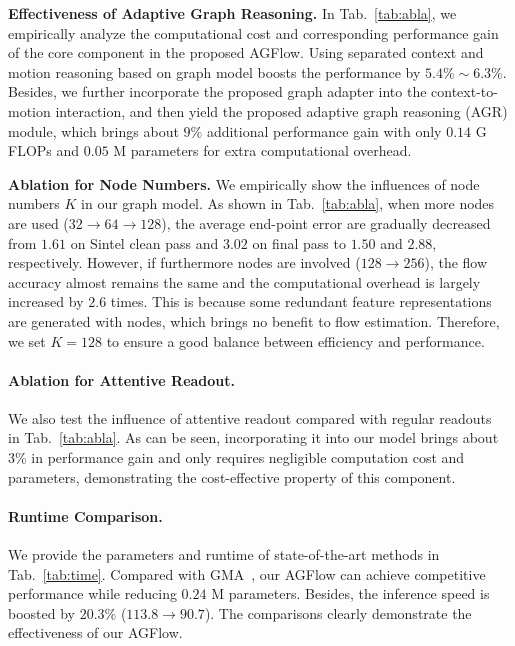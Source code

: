 \documentclass[letterpaper]{article} %
\begin{document}
\textbf{Effectiveness of Adaptive Graph Reasoning.} In Tab.~\ref{tab:abla}, we empirically analyze the computational cost and corresponding performance gain of the core component in the proposed AGFlow. Using separated context and motion reasoning based on graph model boosts the performance by $5.4\% \sim 6.3\%$. Besides, we further incorporate the proposed graph adapter into the context-to-motion interaction, and then yield the proposed adaptive graph reasoning (AGR) module, which brings about $9\%$ additional performance gain with only $0.14$ G FLOPs and $0.05$ M parameters for extra computational overhead.

\textbf{Ablation for Node Numbers.} We empirically show the influences of node numbers $K$ in our graph model. As shown in Tab.~\ref{tab:abla}, when more nodes are used ($32 \rightarrow 64 \rightarrow 128$), the average end-point error are gradually decreased from $1.61$ on Sintel clean pass and $3.02$ on final pass to $1.50$ and $2.88$, respectively. However, if furthermore nodes are involved ($128 \rightarrow 256$), the flow accuracy almost remains the same and the computational overhead is largely increased by $2.6$ times. This is because some redundant feature representations are generated with nodes, which brings no benefit to flow estimation. Therefore, we set $K = 128$ to ensure a good balance between efficiency and performance.

\paragraph{Ablation for Attentive Readout.}
We also test the influence of attentive readout compared with regular readouts~\cite{Li2018BeyondGL} in Tab.~\ref{tab:abla}. As can be seen, incorporating it into our model brings about $3\%$ in performance gain and only requires negligible computation cost and parameters, demonstrating the cost-effective property of this component.

\paragraph{Runtime Comparison.}
We provide the parameters and runtime of state-of-the-art methods in Tab.~\ref{tab:time}. Compared with GMA~\cite{Jiang2021LearningTE}, our AGFlow can achieve competitive performance while reducing $0.24$ M parameters. Besides, the inference speed is boosted by $20.3\%$ ($113.8 \rightarrow 90.7$). The comparisons clearly demonstrate the effectiveness of our AGFlow.
\end{document}
